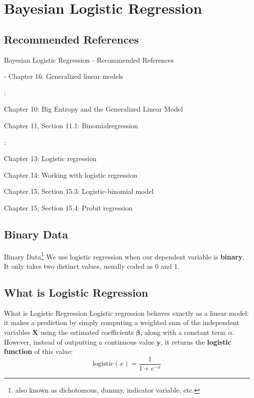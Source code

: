 \section{Bayesian Logistic Regression}

\subsection{Recommended References}
\begin{frame}{Bayesian Logistic Regression - Recommended References}
    \begin{vfilleditems}
        \item \textcite{gelman2013bayesian} - Chapter 16: Generalized linear models
        \item \textcite{mcelreath2020statistical}:
        \begin{vfilleditems}
            \item Chapter 10: Big Entropy and the Generalized Linear Model
            \item Chapter 11, Section 11.1: Binomialregression
        \end{vfilleditems}
        \item \textcite{gelman2020regression}:
        \begin{vfilleditems}
            \item Chapter 13: Logistic regression
            \item Chapter 14: Working with logistic regression
            \item Chapter 15, Section 15.3: Logistic-binomial model
            \item Chapter 15, Section 15.4: Probit regression
        \end{vfilleditems}
    \end{vfilleditems}
\end{frame}

\subsection{Binary Data}
\begin{frame}{Binary Data\footnote{
            also known as dichotomous, dummy, indicator variable, etc.}
    }
    We use logistic regression when our dependent variable is \textbf{binary}.
    It only takes two distinct values,
    usually coded as $0$ and $1$.
\end{frame}

\subsection{What is Logistic Regression}
\begin{frame}{What is Logistic Regression}
    Logistic regression behaves exactly as a linear model:
    it makes a prediction by simply computing a weighted sum of the
    independent variables $\mathbf{X}$ using the estimated coefficients $\boldsymbol{\beta}$,
    along with a constant term $\alpha$.
    However, instead of outputting a continuous value $\mathbf{y}$,
    it returns the \textbf{logistic function} of this value:
    $$
        \text{logistic}(x) = \frac{1}{1 + e^{-x}}
    $$
\end{frame}


